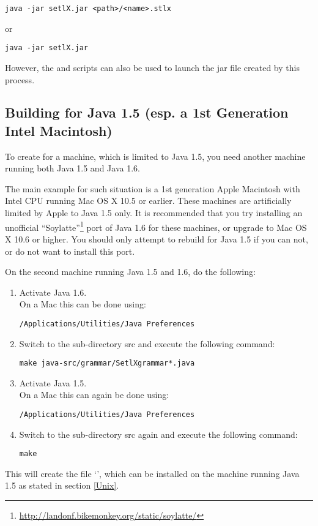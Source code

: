 \begin{lstlisting}[frame=none,numbers=none]
java -jar setlX.jar <path>/<name>.stlx
\end{lstlisting}

or

\begin{lstlisting}[frame=none,numbers=none]
java -jar setlX.jar
\end{lstlisting}

However, the  and  scripts can also be used to launch the jar file created by this process.

\subsection{Building for Java 1.5 (esp. a 1st Generation Intel Macintosh)}\label{MACj5}

To create \setlX{} for a machine, which is limited to Java 1.5, you need another machine running both Java 1.5 and Java 1.6.

The main example for such situation is a 1st generation Apple Macintosh with Intel CPU running Mac OS X 10.5 or earlier. These machines are artificially limited by Apple to Java 1.5 only. It is recommended that you try installing an unofficial ``Soylatte''\footnote{\url{http://landonf.bikemonkey.org/static/soylatte/}} port of Java 1.6 for these machines, or upgrade to Mac OS X 10.6 or higher. You should only attempt to rebuild \setlX{} for Java 1.5 if you can not, or do not want to install this port.

On the second machine running Java 1.5 and 1.6, do the following:

\begin{enumerate}
	\item Activate Java 1.6.\\
		On a Mac this can be done using:
\begin{lstlisting}[frame=none,numbers=none]
/Applications/Utilities/Java Preferences
\end{lstlisting}
	\item Switch to the sub-directory src and execute the following command:
\begin{lstlisting}[frame=none,numbers=none]
make java-src/grammar/SetlXgrammar*.java
\end{lstlisting}
	\item Activate Java 1.5.\\
		On a Mac this can again be done using:
\begin{lstlisting}[frame=none,numbers=none]
/Applications/Utilities/Java Preferences
\end{lstlisting}
	\item Switch to the sub-directory src again and execute the following command:
\begin{lstlisting}[frame=none,numbers=none]
make
\end{lstlisting}
\end{enumerate}
This will create the file `', which can be installed on the machine running Java 1.5 as stated in section \ref{Unix}.

